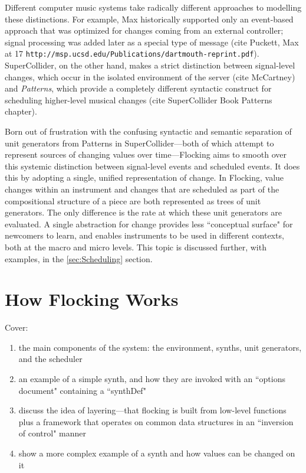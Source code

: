\documentclass{article}
\begin{document}
Different computer music systems take radically different approaches to modelling these distinctions. For example, Max historically supported only an event-based approach that was optimized for changes coming from an external controller; signal processing was added later as a special type of message (cite Puckett, Max at 17 \verb|http://msp.ucsd.edu/Publications/dartmouth-reprint.pdf|). SuperCollider, on the other hand, makes a strict distinction between signal-level changes, which occur in the isolated environment of the server (cite McCartney) and {\it Patterns}, which provide a completely different syntactic construct for scheduling higher-level musical changes (cite SuperCollider Book Patterns chapter).

Born out of frustration with the confusing syntactic and semantic separation of unit generators from Patterns in SuperCollider---both of which attempt to represent sources of changing values over time---Flocking aims to smooth over this systemic distinction between signal-level events and scheduled events. It does this by adopting a single, unified representation of change. In Flocking, value changes within an instrument and changes that are scheduled as part of the compositional structure of a piece are both represented as trees of unit generators. The only difference is the rate at which these unit generators are evaluated. A single abstraction for change provides less ``conceptual surface" for newcomers to learn, and enables instruments to be used in different contexts, both at the macro and micro levels. This topic is discussed further, with examples, in the \ref{sec:Scheduling} section.

\section{How Flocking Works}

Cover:

\begin{enumerate}
\item the main components of the system: the environment, synths, unit generators, and the scheduler
\item an example of a simple synth, and how they are invoked with an ``options document" containing a ``synthDef"
\item discuss the idea of layering---that flocking is built from low-level functions plus a framework that operates on common data structures in an ``inversion of control" manner
\item show a more complex example of a synth and how values can be changed on it
\end{enumerate}
\end{document}

